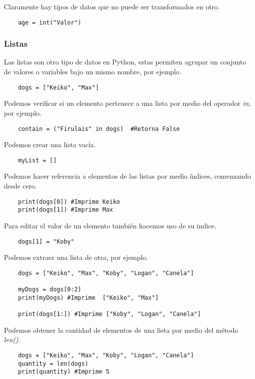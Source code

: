 \documentclass[12pt]{article}
\theoremstyle{definition}
\begin{document}
    Claramente hay tipos de datos que no puede ser transformados en otro.
    \begin{lstlisting}
    age = int("Valor")
    \end{lstlisting}

    \subsubsection{Listas}
    Las listas son otro tipo de datos en Python, estas permiten agrupar un conjunto de valores o variables bajo un mismo
    nombre, por ejemplo.

    \begin{lstlisting}
    dogs = ["Keiko", "Max"]
    \end{lstlisting}

    Podemos verificar si un elemento pertenece a una lista por medio del operador \textit{in}, por ejemplo.
    \begin{lstlisting}
    contain = ("Firulais" in dogs)  #Retorna False
    \end{lstlisting}

    Podemos crear una lista vacía.
    \begin{lstlisting}
    myList = []
    \end{lstlisting}

    Podemos hacer referencia a elementos de las listas por medio índices, comenzando desde cero.
    \begin{lstlisting}
    print(dogs[0]) #Imprime Keiko
    print(dogs[1]) #Imprime Max
    \end{lstlisting}

    Para editar el valor de un elemento también hacemos uso de su indice.
    \begin{lstlisting}
    dogs[1] = "Koby"
    \end{lstlisting}

    Podemos extraer una lista de otra, por ejemplo.
    \begin{lstlisting}
    dogs = ["Keiko", "Max", "Koby", "Logan", "Canela"]

    myDogs = dogs[0:2]
    print(myDogs) #Imprime  ["Keiko", "Max"]

    print(dogs[1:]) #Imprime ["Koby", "Logan", "Canela"]
    \end{lstlisting}

    Podemos obtener la cantidad de elementos de una lista por medio del método \textit{len()}.
    \begin{lstlisting}
    dogs = ["Keiko", "Max", "Koby", "Logan", "Canela"]
    quantity = len(dogs)
    print(quantity) #Imprime 5
    \end{lstlisting}
\end{document}
